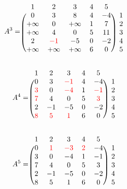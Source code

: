 \documentclass{article}
\begin{document}
\begin{equation*}
A^3=
    \begin{blockarray}{c c c c c c}
        1 & 2 & 3 & 4 & 5 \\
        \begin{block}{(c c c c c)c}
            0 & 3 & 8 & 4 & -4 & 1 \\
            +\infty & 0 & +\infty & 1 & 7 & 2 \\
            +\infty & 4 & 0 & 5 & 11 & 3 \\
            2 & \textcolor{red}{-1} & -5 & 0 & -2 & 4 \\
            +\infty & +\infty & +\infty & 6 & 0 & 5 \\
        \end{block}
    \end{blockarray}
\end{equation*}

\begin{equation*}
A^4=
    \begin{blockarray}{c c c c c c}
        1 & 2 & 3 & 4 & 5 \\
        \begin{block}{(c c c c c)c}
            0 & 3 & \textcolor{red}{-1} & 4 & -4 & 1 \\
            \textcolor{red}{3} & 0 & \textcolor{red}{-4} & 1 & \textcolor{red}{-1} & 2 \\
            \textcolor{red}{7} & 4 & 0 & 5 & \textcolor{red}{3} & 3 \\
            2 & -1 & -5 & 0 & -2 & 4 \\
            \textcolor{red}{8} & \textcolor{red}{5} & \textcolor{red}{1} & 6 & 0 & 5 \\
        \end{block}
    \end{blockarray}
\end{equation*}

\begin{equation*}
A^5=
    \begin{blockarray}{c c c c c c}
        1 & 2 & 3 & 4 & 5 \\
        \begin{block}{(c c c c c)c}
            0 & \textcolor{red}{1} & \textcolor{red}{-3} & \textcolor{red}{2} & -4 & 1 \\
            3 & 0 & -4 & 1 & -1 & 2 \\
            7 & 4 & 0 & 5 & 3 & 3 \\
            2 & -1 & -5 & 0 & -2 & 4 \\
            8 & 5 & 1 & 6 & 0 & 5 \\
        \end{block}
    \end{blockarray}
\end{equation*}
   
\end{document}
